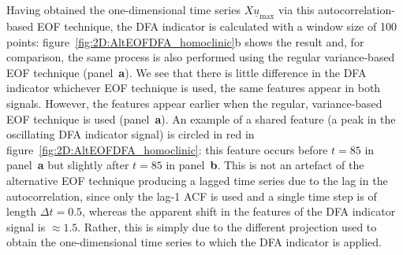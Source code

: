 Having obtained the one-dimensional time series $X\underline{u}_\text{max}$ via this autocorrelation-based EOF technique, the DFA indicator is calculated with a window size of 100 points: figure~\ref{fig:2D:AltEOFDFA_homoclinic}b shows the result and, for comparison, the same process is also performed using the regular variance-based EOF technique (panel~\textbf{a}).  We see that there is little difference in the DFA indicator whichever EOF technique is used, the same features appear in both signals. However, the features appear earlier when the regular, variance-based EOF technique is used (panel~\textbf{a}). An example of a shared feature (a peak in the oscillating DFA indicator signal) is circled in red in figure~\ref{fig:2D:AltEOFDFA_homoclinic}: this feature occurs before $t=85$ in panel~\textbf{a} but slightly after $t=85$ in panel~\textbf{b}. This is not an artefact of the alternative EOF technique producing a lagged time series due to the lag in the autocorrelation, since only the lag-1 ACF is used and a single time step is of length $\Delta t=0.5$, whereas the apparent shift in the features of the DFA indicator signal is $\approx 1.5$. Rather, this is simply due to the different projection used to obtain the one-dimensional time series to which the DFA indicator is applied. 

